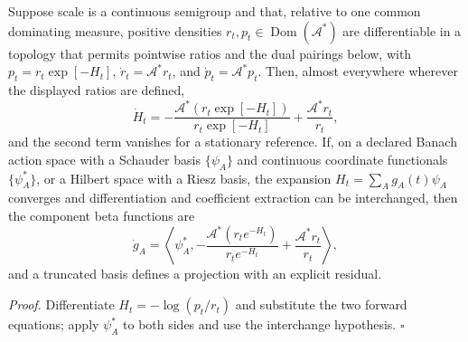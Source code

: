 Suppose scale is a continuous semigroup and that, relative to one common
dominating measure, positive densities
\(r_t,p_t\in\operatorname{Dom}(\mathcal A^*)\) are differentiable in a topology
that permits pointwise ratios and the dual pairings below, with
\(p_t=r_t\exp[-H_t]\), \(\dot r_t=\mathcal A^*r_t\), and
\(\dot p_t=\mathcal A^*p_t\). Then, almost everywhere wherever the displayed
ratios are defined,
\begin{equation}
\dot H_t
=-\frac{\mathcal A^*(r_t\exp[-H_t])}{r_t\exp[-H_t]}
+\frac{\mathcal A^*r_t}{r_t},
\label{eq:rg-continuous-beta-functional}
\end{equation}
and the second term vanishes for a stationary reference. If, on a declared
Banach action space with a Schauder basis \(\{\psi_A\}\) and continuous
coordinate functionals \(\{\psi_A^*\}\), or a Hilbert space with a Riesz basis,
the expansion \(H_t=\sum_Ag_A(t)\psi_A\) converges and differentiation and
coefficient extraction can be interchanged, then the component beta functions
are
\begin{equation}
\dot g_A=\left\langle\psi_A^*,
-\frac{\mathcal A^*(r_te^{-H_t})}{r_te^{-H_t}}
+\frac{\mathcal A^*r_t}{r_t}\right\rangle,
\label{eq:rg-component-beta}
\end{equation}
and a truncated basis defines a projection with an explicit residual.

\noindent\emph{Proof.}
Differentiate \(H_t=-\log(p_t/r_t)\) and substitute the two forward equations;
apply \(\psi_A^*\) to both sides and use the interchange hypothesis. \(\square\)

